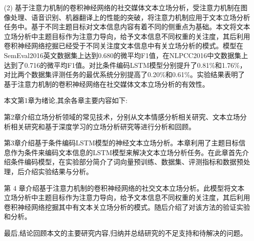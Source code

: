 (2) 基于注意力机制的卷积神经网络的社交媒体文本立场分析，受注意力机制在图像处理、语音识别、机器翻译上的性能的突破，将注意力机制应用于文本立场分析任务中。基于不同主题目标对文本信息内容有着不同的侧重点为基础。本文将文本立场分析中主题目标作为注意力导向，给予文本信息不同权重的关注度，其后利用卷积神经网络挖掘已经受于不同关注度文本信息中有关立场分析的模式。模型在SemEval2016英文数据集上达到0.680的微平均F1值，在NLPCC2016中文数据集上达到了0.716的微平均F1值。对比条件编码LSTM模型分别提升了0.81\%和1.76\%，对比两个数据集评测任务的最优系统分别提高了0.20\%和0.61\%。实验结果表明了基于注意力机制的卷积神经网络在社交媒体文本立场分析的有效性。

本文第1章为绪论,其余各章主要内容如下:

第2章介绍立场分析领域的常见技术，分别从文本情感分析相关研究、文本立场分析相关研究和基于深度学习的立场分析研究等进行分析和回顾。

第3章介绍基于条件编码LSTM模型的神经文本立场分析。本章利用了主题目标信息作为条件来编码文本信息的LSTM模型来解决文本立场分析任务。在此章首先介绍条件编码模型，在实验部分简介了词向量预训练、数据集、评测指标和数据预处理，后介绍实验结果与分析。

第 4 章介绍基于注意力机制的卷积神经网络的社交文本立场分析。此模型将文本立场分析中主题目标作为注意力导向，给予文本信息不同权重的关注度，其后利用卷积神经网络挖掘其中有文本关立场分析的模式。随后介绍了对该方法的验证实验和分析。

最后,结论回顾本文的主要研究内容,归纳并总结研究的不足支持和待解决的问题。

